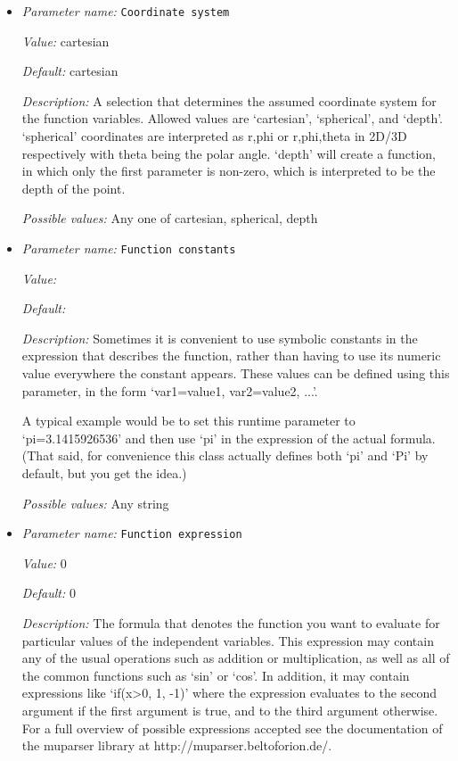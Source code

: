 \begin{itemize}
\item {\it Parameter name:} {\tt Coordinate system}
\label{parameters:Boundary heat flux model/Function/Coordinate system}


{\it Value:} cartesian


{\it Default:} cartesian


{\it Description:} A selection that determines the assumed coordinate system for the function variables. Allowed values are `cartesian', `spherical', and `depth'. `spherical' coordinates are interpreted as r,phi or r,phi,theta in 2D/3D respectively with theta being the polar angle. `depth' will create a function, in which only the first parameter is non-zero, which is interpreted to be the depth of the point.


{\it Possible values:} Any one of cartesian, spherical, depth
\item {\it Parameter name:} {\tt Function constants}
\label{parameters:Boundary heat flux model/Function/Function constants}


{\it Value:} 


{\it Default:} 


{\it Description:} Sometimes it is convenient to use symbolic constants in the expression that describes the function, rather than having to use its numeric value everywhere the constant appears. These values can be defined using this parameter, in the form `var1=value1, var2=value2, ...'.

A typical example would be to set this runtime parameter to `pi=3.1415926536' and then use `pi' in the expression of the actual formula. (That said, for convenience this class actually defines both `pi' and `Pi' by default, but you get the idea.)


{\it Possible values:} Any string
\item {\it Parameter name:} {\tt Function expression}
\label{parameters:Boundary heat flux model/Function/Function expression}


{\it Value:} 0


{\it Default:} 0


{\it Description:} The formula that denotes the function you want to evaluate for particular values of the independent variables. This expression may contain any of the usual operations such as addition or multiplication, as well as all of the common functions such as `sin' or `cos'. In addition, it may contain expressions like `if(x>0, 1, -1)' where the expression evaluates to the second argument if the first argument is true, and to the third argument otherwise. For a full overview of possible expressions accepted see the documentation of the muparser library at http://muparser.beltoforion.de/.


\end{itemize}
